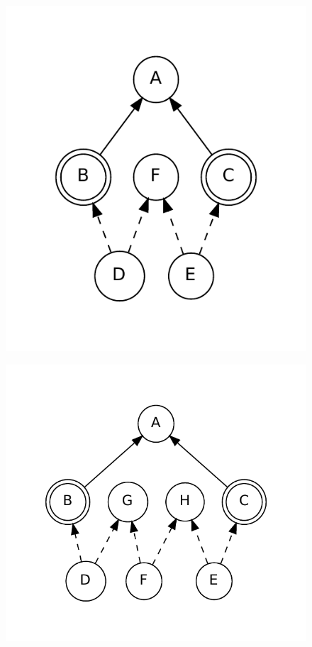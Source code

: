 \begin{figure}[t]
\begin{minipage}[t]{0.5\linewidth}
    \label{fig:single2}
  \end{minipage}
  \\
  \begin{minipage}[t]{0.5\linewidth}
    \centering
    \includegraphics[scale=0.6]{figures/complementation/single-3.pdf}
    \label{fig:single3}
  \end{minipage}
  \hspace{0.2in}
  \begin{minipage}[t]{0.5\linewidth}
    \centering
    \includegraphics[scale=0.6]{figures/complementation/single-4.pdf}

\end{minipage}
\end{figure}
